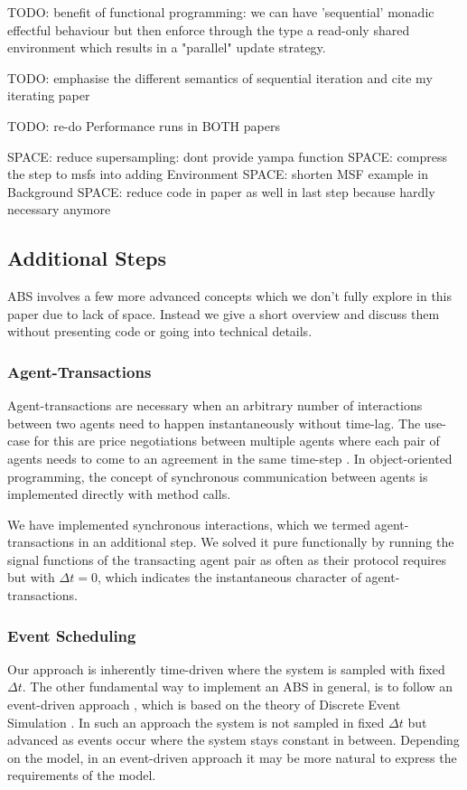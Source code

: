 TODO: benefit of functional programming: we can have 'sequential' monadic effectful behaviour but then enforce through the type a read-only shared environment which results in a "parallel" update strategy.

TODO: emphasise the different semantics of sequential iteration and cite my iterating paper 

TODO: re-do Performance runs in BOTH papers

SPACE: reduce supersampling: dont provide yampa function
SPACE: compress the step to msfs into adding Environment
SPACE: shorten MSF example in Background
SPACE: reduce code in paper as well in last step because hardly necessary anymore







\subsection{Additional Steps}
ABS involves a few more advanced concepts which we don't fully explore in this paper due to lack of space. Instead we give a short overview and discuss them without presenting code or going into technical details.

\subsubsection{Agent-Transactions}
Agent-transactions are necessary when an arbitrary number of interactions between two agents need to happen instantaneously without time-lag. The use-case for this are price negotiations between multiple agents where each pair of agents needs to come to an agreement in the same time-step \cite{epstein_growing_1996}. In object-oriented programming, the concept of synchronous communication between agents is implemented directly with method calls.

We have implemented synchronous interactions, which we termed agent-transactions in an additional step. We solved it pure functionally by running the signal functions of the transacting agent pair as often as their protocol requires but with $\Delta t=0$, which indicates the instantaneous character of agent-transactions.

\subsubsection{Event Scheduling}
Our approach is inherently time-driven where the system is sampled with fixed $\Delta t$. The other fundamental way to implement an ABS in general, is to follow an event-driven approach \cite{meyer_event-driven_2014}, which is based on the theory of Discrete Event Simulation \cite{zeigler_theory_2000}. In such an approach the system is not sampled in fixed $\Delta t$ but advanced as events occur where the system stays constant in between. Depending on the model, in an event-driven approach it may be more natural to express the requirements of the model.

